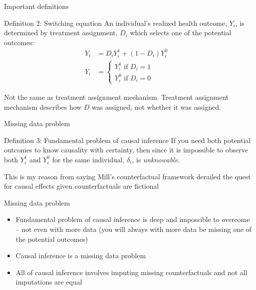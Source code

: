 \documentclass{beamer}
\begin{document}
\begin{frame}{Important definitions}


    \begin{block}{Definition 2: Switching equation}
      An individual's realized health outcome, $Y_i$, is determined by treatment assignment, $D_i$ which selects one of the potential outcomes:
      \begin{eqnarray*}
        Y_i& = D_iY^1_i+(1-D_i)Y^0_i& \\
        Y_i& = \begin{cases}
          Y^1_i\text{ if }D_i=1 \\
          Y^0_i\text{ if }D_i=0
        \end{cases}
      \end{eqnarray*}
    \end{block}
    
    Not the same as treatment assignment mechanism.  Treatment assignment mechanism describes how $D$ was assigned, not whether it was assigned.

\end{frame}


\begin{frame}{Missing data problem}


    \begin{block}{Definition 3: Fundamental problem of causal inference}
      If you need both potential outcomes to know causality with certainty, then since it is impossible to observe both $Y_i^1$ and $Y_i^0$ for the same individual, $\delta_i$, is \emph{unknowable}.
    \end{block}

This is my reason from saying Mill's counterfactual framework derailed the quest for causal effects given counterfactuals are fictional
    
\end{frame}

\begin{frame}{Missing data problem}


    
      \begin{itemize}
    \item Fundamental problem of causal inference is deep and impossible to overcome -- not even with more data (you will always with more data be missing one of the potential outcomes)
    \item Causal inference is a missing data problem 
    \item All of causal inference involves imputing missing counterfactuals and not all imputations are equal
  \end{itemize}

    
\end{frame}
\end{document}
